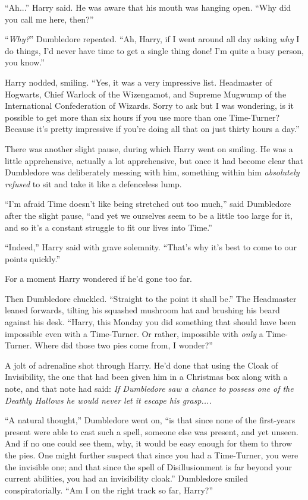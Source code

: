 ``Ah...'' Harry said. He was aware that his mouth was hanging open. ``Why did you call me here, then?''

``\emph{Why?}'' Dumbledore repeated. ``Ah, Harry, if I went around all day asking \emph{why} I do things, I'd never have time to get a single thing done! I'm quite a busy person, you know.''

Harry nodded, smiling. ``Yes, it was a very impressive list. Headmaster of Hogwarts, Chief Warlock of the Wizengamot, and Supreme Mugwump of the International Confederation of Wizards. Sorry to ask but I was wondering, is it possible to get more than six hours if you use more than one Time-Turner? Because it's pretty impressive if you're doing all that on just thirty hours a day.''

There was another slight pause, during which Harry went on smiling. He was a little apprehensive, actually a lot apprehensive, but once it had become clear that Dumbledore was deliberately messing with him, something within him \emph{absolutely refused} to sit and take it like a defenceless lump.

``I'm afraid Time doesn't like being stretched out too much,'' said Dumbledore after the slight pause, ``and yet we ourselves seem to be a little too large for it, and so it's a constant struggle to fit our lives into Time.''

``Indeed,'' Harry said with grave solemnity. ``That's why it's best to come to our points quickly.''

For a moment Harry wondered if he'd gone too far.

Then Dumbledore chuckled. ``Straight to the point it shall be.'' The Headmaster leaned forwards, tilting his squashed mushroom hat and brushing his beard against his desk. ``Harry, this Monday you did something that should have been impossible even with a Time-Turner. Or rather, impossible with \emph{only} a Time-Turner. Where did those two pies come from, I wonder?''

A jolt of adrenaline shot through Harry. He'd done that using the Cloak of Invisibility, the one that had been given him in a Christmas box along with a note, and that note had said: \emph{If Dumbledore saw a chance to possess one of the Deathly Hallows he would never let it escape his grasp.}\emph{...}

``A natural thought,'' Dumbledore went on, ``is that since none of the first-years present were able to cast such a spell, someone else was present, and yet unseen. And if no one could see them, why, it would be easy enough for them to throw the pies. One might further suspect that since you had a Time-Turner, you were the invisible one; and that since the spell of Disillusionment is far beyond your current abilities, you had an invisibility cloak.'' Dumbledore smiled conspiratorially. ``Am I on the right track so far, Harry?''

